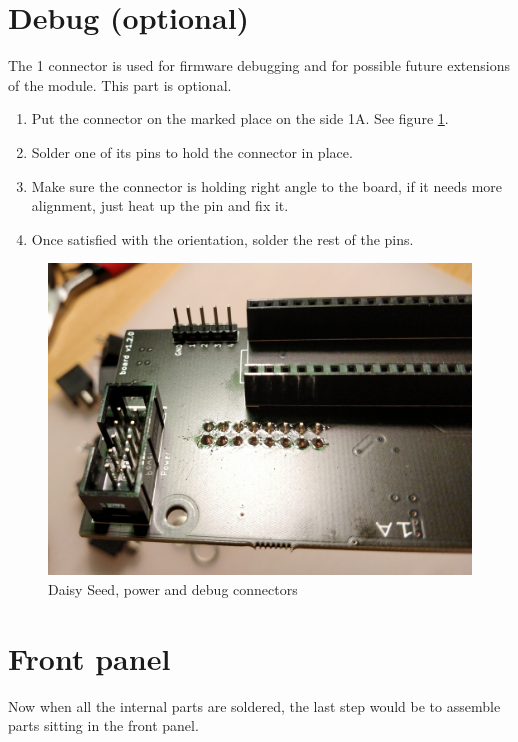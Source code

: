 \documentclass[10pt,a4paper,twocolumn]{article}
\begin{document}
\section{Debug (optional)}

The 1 connector is used for firmware debugging and for possible future extensions of the module. This part is optional.

\begin{enumerate}
  \item Put the connector on the marked place on the side 1A. See figure \ref{connectors}.
  \item Solder one of its pins to hold the connector in place.
  \item Make sure the connector is holding right angle to the board, if it needs more alignment, just heat up the pin and fix it.
  \item Once satisfied with the orientation, solder the rest of the pins.
\end{enumerate}

\begin{figure}[p]
  \centering
  \includegraphics[width=\linewidth]{p05.jpg}
  \caption{Daisy Seed, power and debug connectors}
  \label{connectors}
\end{figure}

\clearpage

\section{Front panel}

Now when all the internal parts are soldered, the last step would be to assemble parts sitting in the front panel.
\end{document}
